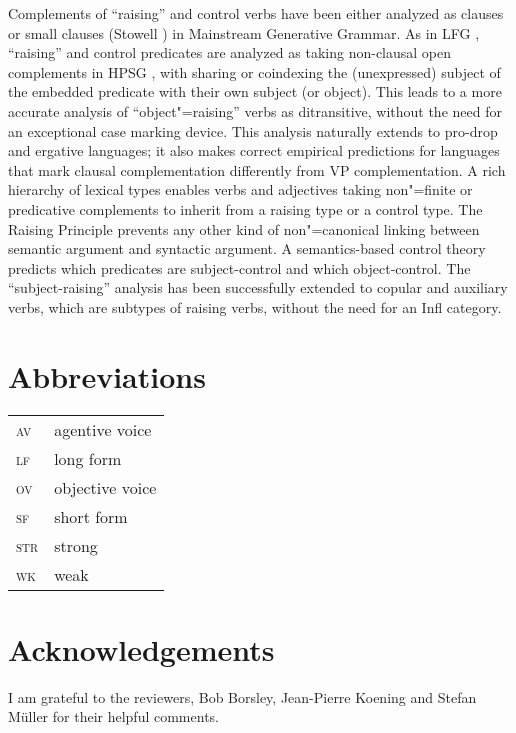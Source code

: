 Complements of ``raising'' and control verbs have been either analyzed as clauses \citep{Chomsky81a}\addpages
or small clauses (Stowell \citeyear{Stowell81a-u,Stowell1983}\addpages) in Mainstream Generative Grammar.  As in LFG
\citep{Bresnan1982}, ``raising'' and control predicates are analyzed as taking non-clausal open
complements in HPSG \citep[Chapter~3]{PollardandSag1994}, with sharing or coindexing the (unexpressed) subject
of the embedded predicate with their own subject (or object). This leads to a more accurate analysis
of ``object"=raising'' verbs as ditransitive, without the need for an exceptional case marking
device. This analysis naturally extends to pro-drop and ergative languages; it also makes correct
empirical predictions for languages that mark clausal complementation differently from VP
complementation. A rich hierarchy of lexical types enables verbs and adjectives taking non"=finite
or predicative complements to inherit from a raising type or a control type. The Raising Principle
prevents any other kind of non"=canonical linking between semantic argument and syntactic
argument. A semantics-based control theory predicts which predicates are subject-control and which
object-control. The ``subject-raising'' analysis has been successfully extended to copular and
auxiliary verbs, which are subtypes of raising verbs, without the need for an Infl category.



\section*{Abbreviations}

\begin{tabularx}{.45\textwidth}{@{}lX}
\textsc{av} & agentive voice\\
\textsc{lf} & long form\\ 
\textsc{ov} & objective voice\\
\textsc{sf} & short form\\
\textsc{str} & strong\\
\textsc{wk} & weak\\

\end{tabularx}

\section*{Acknowledgements}

I am grateful to the reviewers, Bob Borsley, Jean-Pierre Koening and Stefan Müller for their helpful comments.
{\sloppy
\printbibliography[heading=subbibliography,notkeyword=this] 
}




